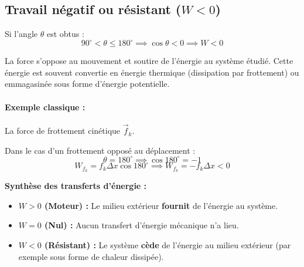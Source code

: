 \documentclass[11pt,openany]{book}
\begin{document}
\subsection{Travail négatif ou résistant ($W < 0$)}

Si l'angle $\theta$ est obtus :
\[
90^\circ < \theta \le 180^\circ \implies \cos\theta < 0 \implies \boxed{W < 0}
\]

La force s'oppose au mouvement et soutire de l'énergie au système étudié. Cette énergie est souvent convertie en énergie thermique (dissipation par frottement) ou emmagasinée sous forme d'énergie potentielle.

\paragraph{Exemple classique :} La force de frottement cinétique $\vec{f}_k$.

\begin{center}
\end{center}

Dans le cas d'un frottement opposé au déplacement :
\[
\theta = 180^\circ \implies \cos 180^\circ = -1
\]
\[
W_{f_k} = f_k \Delta x \cos 180^\circ \implies \boxed{W_{f_k} = -f_k \Delta x < 0}
\]

\begin{important}
\textbf{Synthèse des transferts d'énergie :}
\begin{itemize}
    \item \textbf{$W > 0$ (Moteur) :} Le milieu extérieur \textbf{fournit} de l'énergie au système.
    \item \textbf{$W = 0$ (Nul) :} Aucun transfert d'énergie mécanique n'a lieu.
    \item \textbf{$W < 0$ (Résistant) :} Le système \textbf{cède} de l'énergie au milieu extérieur (par exemple sous forme de chaleur dissipée).
\end{itemize}
\end{important}
\end{document}
